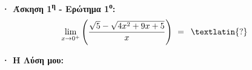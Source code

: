 \documentclass{article}
\begin{document}

\newpage
\noindent \textbf{ }


\newpage

\vspace{3cm}

\begin{center}
\noindent {}
\end{center}

\vspace{1.25cm}

\noindent \textbf{· Άσκηση 1\textsuperscript{η} - Ερώτημα 1\textsuperscript{ο}:} \hfill \\[1ex]

\[
    \lim_{x \to 0^+} \left( \frac{\sqrt{5} - \sqrt{4x^2 + 9x + 5}}{x} \right) \hspace{0.125cm} = \hspace{0.175cm} \textlatin{?} 
\]

\vspace{1cm}

\noindent \textbf{· Η Λύση μου:} \hfill
\end{document}
